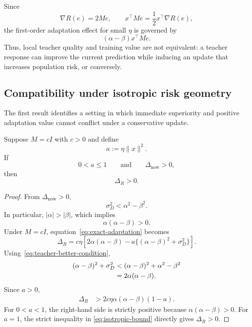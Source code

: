 Since
\begin{equation}
    \nabla R(e)=2Me,
    \qquad
    x^\top Me=\frac{1}{2}x^\top\nabla R(e),
\end{equation}
the first-order adaptation effect for small $\eta$ is governed by
\begin{equation}
    (\alpha-\beta)x^\top Me.
    \label{eq:geometric-factor}
\end{equation}
Thus, local teacher quality and training value are not equivalent: a teacher
response can improve the current prediction while inducing an update that
increases population risk, or conversely.

\subsection{Compatibility under isotropic risk geometry}

The first result identifies a setting in which immediate superiority and
positive adaptation value cannot conflict under a conservative update.

\begin{adaptationproposition}
Suppose $M=cI$ with $c>0$ and define
\begin{equation}
    a:=\eta\|x\|^2.
\end{equation}
If
\begin{equation}
    0<a\leq1
    \qquad\text{and}\qquad
    \Delta_{\mathrm{now}}>0,
\end{equation}
then
\begin{equation}
    \Delta_R>0.
\end{equation}
\end{adaptationproposition}

\begin{proof}
From $\Delta_{\mathrm{now}}>0$,
\begin{equation}
    \sigma_D^2<\alpha^2-\beta^2.
    \label{eq:teacher-better-condition}
\end{equation}
In particular, $|\alpha|>|\beta|$, which implies
\begin{equation}
    \alpha(\alpha-\beta)>0.
\end{equation}
Under $M=cI$, equation~\eqref{eq:exact-adaptation} becomes
\begin{equation}
    \Delta_R
    =
    c\eta
    \left[
        2\alpha(\alpha-\beta)
        -a\bigl\{(\alpha-\beta)^2+\sigma_D^2\bigr\}
    \right].
\end{equation}
Using~\eqref{eq:teacher-better-condition},
\begin{align}
    (\alpha-\beta)^2+\sigma_D^2
    &<
    (\alpha-\beta)^2+\alpha^2-\beta^2
    \notag\\
    &=
    2\alpha(\alpha-\beta).
\end{align}
Since $a>0$,
\begin{align}
    \Delta_R
    &>
    2c\eta\alpha(\alpha-\beta)(1-a).
    \label{eq:isotropic-bound}
\end{align}
For $0<a<1$, the right-hand side is strictly positive because
$\alpha(\alpha-\beta)>0$. For $a=1$, the strict inequality in
\eqref{eq:isotropic-bound} directly gives $\Delta_R>0$.
\end{proof}

